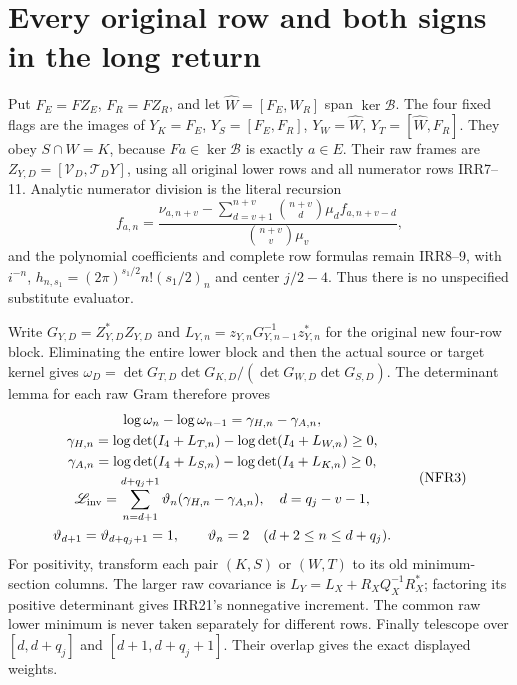 \documentclass[11pt,a4paper]{article}
\begin{document}
\section{Every original row and both signs in the long return}
Put $F_E=FZ_E$, $F_R=FZ_R$, and let
$\widehat W=[F_E,W_R]$ span $\ker\mathcal B$.
The four fixed flags are the images of
$Y_K=F_E$, $Y_S=[F_E,F_R]$,
$Y_W=\widehat W$, $Y_T=[\widehat W,F_R]$.
They obey $S\cap W=K$, because $Fa\in\ker\mathcal B$ is exactly
$a\in E$. Their raw frames are
$Z_{Y,D}=[\mathcal V_D,\mathcal T_DY]$, using all original
lower rows and all numerator rows IRR7--11.
Analytic numerator division is the literal recursion
\[
 f_{a,n}=
 \frac{\nu_{a,n+v}-\sum_{d=v+1}^{n+v}
                 \binom{n+v}{d}\mu_df_{a,n+v-d}}
      {\binom{n+v}{v}\mu_v},
\]
and the polynomial coefficients and complete row formulas remain
IRR8--9, with $i^{-n}$, $h_{n,s_1}=(2\pi)^{s_1/2}n!(s_1/2)_n$
and center $j/2-4$. Thus there is no unspecified substitute evaluator.

Write $G_{Y,D}=Z_{Y,D}^*Z_{Y,D}$ and
$L_{Y,n}=z_{Y,n}G_{Y,n-1}^{-1}z_{Y,n}^*$ for the original new
four-row block. Eliminating the entire lower block and then the
actual source or target kernel gives
$\omega_D=\det G_{T,D}\det G_{K,D}/(\det G_{W,D}\det G_{S,D})$.
The determinant lemma for each raw Gram therefore proves
\[
\begin{gathered}
 \log\omega_n-\log\omega_{n-1}
       =\gamma_{H,n}-\gamma_{A,n},\\
 \gamma_{H,n}=\log\det(I_4+L_{T,n})-\log\det(I_4+L_{W,n})\ge0,\\
 \gamma_{A,n}=\log\det(I_4+L_{S,n})-\log\det(I_4+L_{K,n})\ge0,\\
 \mathscr L_{\rm inv}=\sum_{n=d+1}^{d+q_j+1}
       \vartheta_n(\gamma_{H,n}-\gamma_{A,n}),\quad d=q_j-v-1,\\
 \vartheta_{d+1}=\vartheta_{d+q_j+1}=1,\qquad
 \vartheta_n=2\quad(d+2\le n\le d+q_j).
\end{gathered}\tag{NFR3}
\]
For positivity, transform each pair $(K,S)$ or $(W,T)$ to its old
minimum-section columns. The larger raw covariance is
$L_Y=L_X+R_XQ_X^{-1}R_X^*$; factoring its positive determinant
gives IRR21's nonnegative increment. The common raw lower minimum
is never taken separately for different rows. Finally telescope
over $[d,d+q_j]$ and $[d+1,d+q_j+1]$. Their overlap gives the
exact displayed weights.
\end{document}
